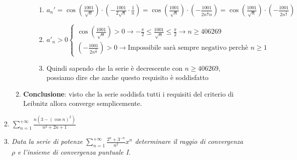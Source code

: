 \documentclass[12pt, a4paper]{article}
\begin{document}
\begin{enumerate}
\begin{enumerate}
\begin{enumerate}
\begin{enumerate}
                        \item $a_n'=\cos\left(\frac{1001}{\sqrt{n}}\right)\cdot\left(-\frac{1001}{2\sqrt{n}}\cdot\frac{1}{n}\right)=\cos\left(\frac{1001}{\sqrt{n}}\right)\cdot\left(-\frac{1001}{2n^{\frac{1}{2}}n}\right)=\cos\left(\frac{1001}{\sqrt{n}}\right)\cdot\left(-\frac{1001}{2n^{\frac{3}{2}}}\right)$
                        \item $a'_n>0\begin{cases}
                            \cos\left(\frac{1001}{\sqrt{n}}\right)>0\rightarrow -\frac{\pi}{2}\leq\frac{1001}{\sqrt{n}}\leq\frac{\pi}{2}\rightarrow n \geq 406269\\
                            \left(-\frac{1001}{2n^{\frac{3}{2}}}\right)>0\rightarrow \text{Impossibile sarà sempre negativo perchè } n\geq 1
                        \end{cases}$
                        \item Quindi sapendo che la serie è decrescente con $n\geq 406269$, possiamo dire che anche questo requisito è soddisfatto
                    \end{enumerate}
                \end{enumerate}
                \item \textbf{Conclusione}: visto che la serie soddisfa tutti i requisiti del criterio di Leibnitz allora converge semplicemente.
            \end{enumerate}
            \item $\sum_{n=1}^{+\infty}\frac{n(3-(\cos n)^2)}{n^3+2n+1}$
            \item \textit{Data la serie di potenze} $\sum_{n=1}^{+\infty}\frac{2^n+3^{-n}}{n^2}x^n$ \textit{determinare il raggio di convergenza $\rho$ e l'insieme di convergenza puntuale I}.
        \end{enumerate}
\end{document}
